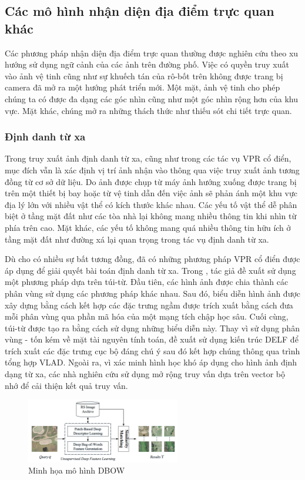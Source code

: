\subsection{Các mô hình nhận diện địa điểm trực quan khác}
Các phương pháp nhận diện địa điểm trực quan thường được nghiên cứu theo xu hướng sử dụng ngữ cảnh của các ảnh trên đường phố. Việc có quyền truy xuất vào ảnh vệ tinh cũng như sự khuếch tán của rô-bốt trên không được trang bị camera đã mở ra một hướng phát triển mới. Một mặt, ảnh vệ tinh cho phép chúng ta có được đa dạng các góc nhìn cũng như một góc nhìn rộng hơn của khu vực. Mặt khác, chúng mở ra những thách thức như thiếu sót chi tiết trực quan.

\subsubsection{Định danh từ xa}
Trong truy xuất ảnh định danh từ xa, cũng như trong các tác vụ VPR cổ điển, mục đích vẫn là xác định vị trí ảnh nhận vào thông qua việc truy xuất ảnh tương đồng từ cơ sở dữ liệu. Do ảnh được chụp từ máy ảnh hướng xuống được trang bị trên một thiết bị bay hoặc từ vệ tinh dẫn đến việc ảnh sẽ phản ánh một khu vực địa lý lớn với nhiều vật thể có kích thước khác nhau. Các yếu tố vật thể dễ phân biệt ở tầng mặt đất như các tòa nhà lại không mang nhiều thông tin khi nhìn từ phía trên cao. Mặt khác, các yếu tố không mang quá nhiều thông tin hữu ích ở tầng mặt đất như đường xá lại quan trọng trong tác vụ định danh từ xa.

Dù cho có nhiều sự bất tương đồng, đã có những phương pháp VPR cổ điển được áp dụng để giải quyết bài toán định danh từ xa. Trong \cite{Tang2018UnsupervisedDF}, tác giả đề xuất sử dụng một phương pháp dựa trên túi-từ. Đầu tiên, các hình ảnh được chia thành các phân vùng sử dụng các phương pháp khác nhau. Sau đó, biểu diễn hình ảnh được xây dựng bằng cách kết hợp các đặc trưng ngầm được trích xuất bằng cách đưa mỗi phân vùng qua phần mã hóa của một mạng tích chập học sâu. Cuối cùng, túi-từ được tạo ra bằng cách sử dụng những biểu diễn này. Thay vì sử dụng phân vùng - tốn kém về mặt tài nguyên tính toán, \cite{Imbriaco_2019} đề xuất sử dụng kiến trúc DELF để trích xuất các đặc trưng cục bộ đáng chú ý sau đó kết hợp chúng thông qua trình tổng hợp VLAD. Ngoài ra, vì xác minh hình học khó áp dụng cho hình ảnh định dạng từ xa, các nhà nghiên cứu sử dụng mở rộng truy vấn dựa trên vector bộ nhớ \cite{7870636} để cải thiện kết quả truy vấn.

\begin{figure}[H]
    \centering
    \includegraphics[width=0.6\textwidth]{pics/Chapter2/rsir.png}
    \caption{Minh họa mô hình DBOW \cite{Tang2018UnsupervisedDF}}
\end{figure}

